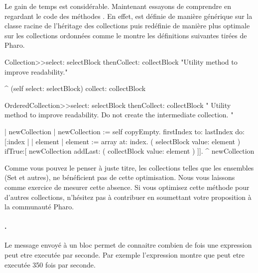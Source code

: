 \documentclass[a4paper,10pt,twoside]{book}
\begin{document}
Le gain de temps est consid\'erable. Maintenant essayons de comprendre en regardant le code 
des m\'ethodes . En effet,  est d\'efinie de mani\`ere 
g\'en\'erique sur la classe  racine de l'h\'eritage des collections puis red\'efinie de 
mani\`ere plus optimale sur les collections ordonn\'ees comme le montre les d\'efinitions suivantes tir\'ees de Pharo.

\begin{code}{}
Collection>>select: selectBlock thenCollect: collectBlock
	"Utility method to improve readability."

	^ (self select: selectBlock) collect: collectBlock
\end{code}

\begin{code}{}
OrderedCollection>>select: selectBlock thenCollect: collectBlock
    " Utility method to improve readability.
	Do not create the intermediate collection. "

	| newCollection |
    newCollection := self copyEmpty.
    firstIndex to: lastIndex do:[:index |
		| element |
		element := array at: index.
		( selectBlock value: element ) 
			ifTrue:[ newCollection addLast: ( collectBlock value: element ) ]].
    ^ newCollection
\end{code}

Comme vous pouvez le penser \`a juste titre, les collections telles que les ensembles (Set et autres), ne b\'en\'eficient pas 
de cette optimisation. Nous vous laissons comme exercice de mesurer cette absence. Si vous optimisez cette m\'ethode pour d'autres collections, n'h\'esitez pas \`a contribuer en soumettant votre proposition \`a la communaut\'e Pharo.



\paragraph{.}
Le message  envoy\'e \`a un bloc permet de connaitre combien de fois une expression peut etre execut\'ee par seconde. Par exemple l'expression  montre que  peut etre execut\'ee 350 fois par seconde.
\end{document}
